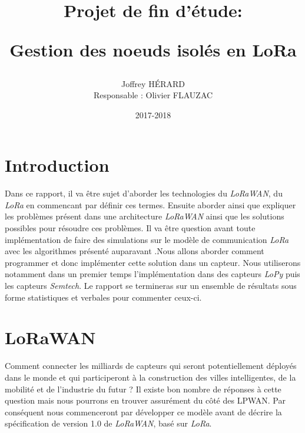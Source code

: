 \documentclass[11pt]{article}
\begin{document}
 \makeatletter
\def\maketitle{%
  \null
  \thispagestyle{empty}%
   \vfill
  \begin{center}\leavevmode
    \normalfont
    {\Huge \@title\par}%
    \vskip 3cm
    {\Large \@author\par}%
    \vskip 1cm
    {\Large \@date\par}%
  \end{center}%
  \vfill
  \null
  \cleardoublepage
  }
\makeatother
\title{\begin{center}Projet de fin d'étude:\end{center} Gestion des noeuds isolés en LoRa }
\author{ Joffrey HÉRARD 
\begin{center}Responsable : Olivier FLAUZAC\end{center}}
\date{2017-2018}
\maketitle 
 
\tableofcontents 

\setlength{\parskip}{0.5em}
\newpage
\section{Introduction}
Dans ce rapport, il va être sujet d'aborder les technologies du \textit{LoRaWAN}, du \textit{LoRa} en commencant par définir ces termes. Ensuite aborder ainsi que expliquer les problèmes présent dans une architecture \textit{LoRaWAN} ainsi que les solutions possibles pour résoudre ces problèmes. Il va être question avant toute implémentation de faire des simulations sur le modèle de communication \textit{LoRa} avec les algorithmes présenté auparavant .Nous allons aborder comment programmer et donc implémenter cette solution dans un capteur. Nous utiliserons notamment dans un premier temps l'implémentation dans des capteurs \textit{LoPy} puis les capteurs \textit{Semtech}. Le rapport se termineras sur un ensemble de résultats sous forme statistiques et verbales pour commenter ceux-ci.  
\newpage
\section{LoRaWAN}
Comment connecter les milliards de capteurs qui seront potentiellement déployés dans le monde et qui participeront à la construction des villes intelligentes, de la mobilité et de l'industrie du futur ? \newline
Il existe bon nombre de réponses à cette question mais nous pourrons en trouver assurément du côté des LPWAN. Par conséquent nous commenceront par développer ce modèle avant de décrire la spécification de version 1.0 de  \textit{LoRaWAN}, basé sur \textit{LoRa}.
\end{document}
